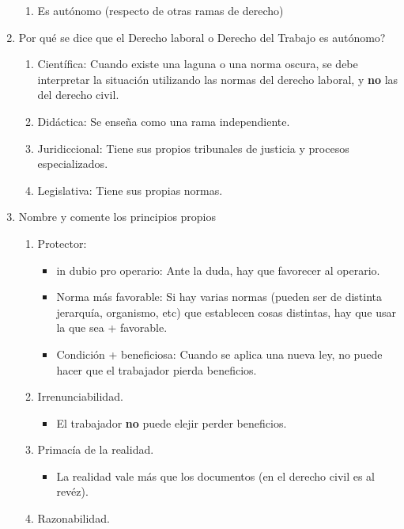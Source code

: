 \documentclass[spanish,12pt,a4paper,titlepage]{report}
\begin{document}
\begin{enumerate}
\begin{enumerate}
  \item Es autónomo (respecto de otras ramas de derecho)
  \end{enumerate}
\item Por qué se dice que el Derecho laboral o Derecho del Trabajo es autónomo?
  \begin{enumerate}
  \item Científica: Cuando existe una laguna o una norma oscura, se debe interpretar la situación utilizando las normas del derecho laboral, y \textbf{no} las del derecho civil.
  \item Didáctica: Se enseña como una rama independiente.
  \item Juridiccional: Tiene sus propios tribunales de justicia y procesos especializados.
  \item Legislativa: Tiene sus propias normas.
  \end{enumerate}
\item Nombre y comente los principios propios
  \begin{enumerate}
  \item Protector:
    \begin{itemize}
    \item in dubio pro operario: Ante la duda, hay que favorecer al operario.
    \item Norma más favorable: Si hay varias normas (pueden ser de distinta jerarquía, organismo, etc) que establecen cosas distintas, hay que usar la que sea + favorable.
    \item Condición + beneficiosa: Cuando se aplica una nueva ley, no puede hacer que el trabajador pierda beneficios.
    \end{itemize}
  \item Irrenunciabilidad.
    \begin{itemize}
    \item El trabajador \textbf{no} puede elejir perder beneficios.
    \end{itemize}
  \item Primacía de la realidad.
    \begin{itemize}
    \item La realidad vale más que los documentos (en el derecho civil es al revéz).
    \end{itemize}
  \item Razonabilidad.
    \begin{itemize}

\end{itemize}
\end{enumerate}
\end{enumerate}
\end{document}
